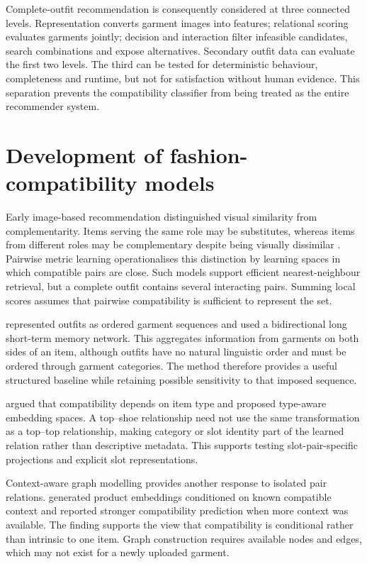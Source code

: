 Complete-outfit recommendation is consequently considered at three connected
levels. Representation converts garment images into features; relational
scoring evaluates garments jointly; decision and interaction filter infeasible
candidates, search combinations and expose alternatives. Secondary outfit data
can evaluate the first two levels. The third can be tested for deterministic
behaviour, completeness and runtime, but not for satisfaction without human
evidence. This separation prevents the compatibility classifier from being
treated as the entire recommender system.

\section{Development of fashion-compatibility models}

Early image-based recommendation distinguished visual similarity from
complementarity. Items serving the same role may be substitutes, whereas items
from different roles may be complementary despite being visually dissimilar
\parencite{mcauley2015styles}. Pairwise metric learning operationalises this
distinction by learning spaces in which compatible pairs are close. Such models
support efficient nearest-neighbour retrieval, but a complete outfit contains
several interacting pairs. Summing local scores assumes that pairwise
compatibility is sufficient to represent the set.

\textcite{han2017bilstm} represented outfits as ordered garment sequences and
used a bidirectional long short-term memory network. This aggregates information
from garments on both sides of an item, although outfits have no natural
linguistic order and must be ordered through garment categories. The method
therefore provides a useful structured baseline while retaining possible
sensitivity to that imposed sequence.

\textcite{vasileva2018typeaware} argued that compatibility depends on item type
and proposed type-aware embedding spaces. A top--shoe relationship need not use
the same transformation as a top--top relationship, making category or slot
identity part of the learned relation rather than descriptive metadata. This
supports testing slot-pair-specific projections and explicit slot
representations.

Context-aware graph modelling provides another response to isolated pair
relations. \textcite{cucurull2019context} generated product embeddings
conditioned on known compatible context and reported stronger compatibility
prediction when more context was available. The finding supports the view that
compatibility is conditional rather than intrinsic to one item. Graph
construction requires available nodes and edges, which may not exist for a
newly uploaded garment.

